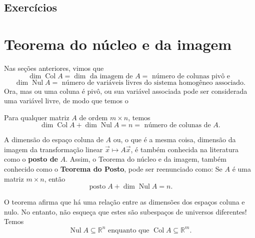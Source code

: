 \construirExeresol

\subsection*{Exercícios}

\construirExer




\section{Teorema do núcleo e da imagem}


Nas seções anteriores, vimos que
\begin{equation}
\operatorname{dim} \operatorname{Col} A  = \operatorname{dim} \text{ da imagem de } A  = \text{ número de colunas pivô e }
\end{equation}
\begin{equation}
\operatorname{dim} \operatorname{Nul} A = \text{ número de variáveis livres do sistema homogêneo associado}.
\end{equation} Ora, mas ou uma coluna é pivô, ou sua variável associada pode ser considerada uma variável livre, de modo que temos o

\begin{teo}
	Para qualquer matriz $A$ de ordem $m\times n$, temos
	\begin{equation}
	\boxed{\operatorname{dim} \operatorname{Col} A + \operatorname{dim} \operatorname{Nul} A = n = \text{ número de colunas de } A.}
	\end{equation}
\end{teo}

\begin{obs}
	A dimensão do espaço coluna de $A$ ou, o que é a mesma coisa, dimensão da imagem da transformação linear $\vec{x} \mapsto A\vec{x}$, é também conhecida na literatura como o \textbf{posto de} $A$. Assim, o Teorema do núcleo e da imagem, também conhecido como o \textbf{Teorema do Posto}, pode ser reenunciado como: Se $A$ é uma matriz $m\times n$, então
	\begin{equation}
	\operatorname{posto} A + \operatorname{dim} \operatorname{Nul} A = n.
	\end{equation}
\end{obs}

\begin{obs}
	O teorema afirma que há uma relação entre as dimensões dos espaços coluna e nulo. No entanto, não esqueça que estes são subespaços de universos diferentes! Temos
	\begin{equation}
	\operatorname{Nul} A \subseteq \mathbb{R}^n \text{ enquanto que } \operatorname{Col} A \subseteq \mathbb{R}^m.
	\end{equation}
\end{obs}

